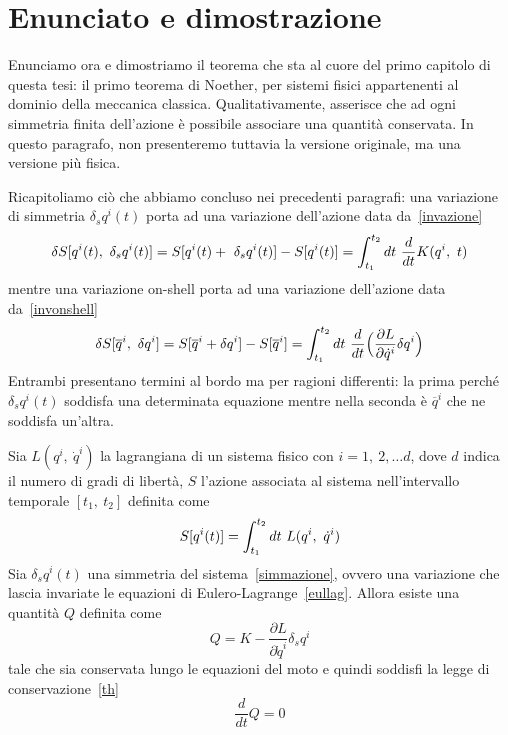 \section{Enunciato e dimostrazione}
    Enunciamo ora e dimostriamo il teorema che sta al cuore del primo capitolo di questa tesi: il primo teorema di Noether, per sistemi fisici appartenenti al dominio della meccanica classica. Qualitativamente, asserisce che ad ogni simmetria finita dell'azione è possibile associare una quantità conservata. In questo paragrafo, non presenteremo tuttavia la versione originale, ma una versione più fisica. 

    Ricapitoliamo ciò che abbiamo concluso nei precedenti paragrafi: una variazione di simmetria $\delta_s q^i(t)$ porta ad una variazione dell'azione data da~\eqref{invazione} 
    \begin{equation*}
        \delta S[q^i(t), ~\delta_s q^i(t)] = S[q^i(t) + ~\delta_s q^i(t)] - S[q^i(t)] = \int_{t_1}^{t_2}dt~ \frac{d}{dt} K(q^i, ~t)
    \end{equation*}
    mentre una variazione on-shell porta ad una variazione dell'azione data da~\eqref{invonshell} 
    \begin{equation*}
        \delta S[\overline q^i,~\delta q^i] = S[\overline q^i + \delta q^i] - S[\overline q^i] = \int_{t_1}^{t_2}dt~ \frac{d}{dt} \Big( \frac{\partial L}{\partial\dot q^i} \delta q^i \Big )
    \end{equation*}
    Entrambi presentano termini al bordo ma per ragioni differenti: la prima perché $\delta_s q^i(t)$ soddisfa una determinata equazione mentre nella seconda è $\overline q^i$ che ne soddisfa un'altra.

    \begin{theorem}
        Sia $L(q^i,~\dot q^i)$ la lagrangiana di un sistema fisico con $i=1,~2,\ldots d$, dove $d$ indica il numero di gradi di libertà, $S$ l'azione associata al sistema nell'intervallo temporale $[t_1,~t_2]$ definita come
    \begin{equation*}
        S[q^i(t)] = \int_{t_1}^{t_2}dt~ L(q^i,~\dot q^i)
    \end{equation*}
        Sia $\delta_s q^i(t)$ una simmetria del sistema~\eqref{simmazione}, ovvero una variazione che lascia invariate le equazioni di Eulero-Lagrange~\eqref{eullag}. Allora esiste una quantità $Q$ definita come
    \begin{equation}\label{carica}
        Q = K - \frac{\partial L}{\partial \dot q^i} \delta_s q^i
    \end{equation}
        tale che sia conservata lungo le equazioni del moto e quindi soddisfi la legge di conservazione~\eqref{th}
    \begin{equation*} 
        \frac{d}{dt} Q = 0
    \end{equation*}
    \end{theorem}

